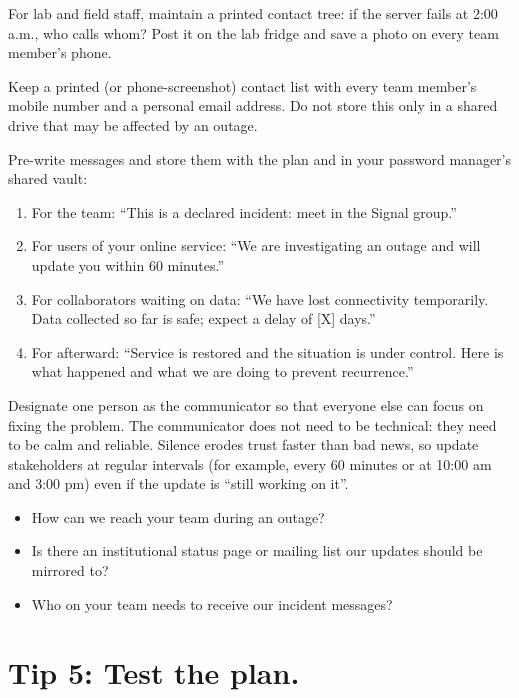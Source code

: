 \documentclass[10pt,letterpaper]{article}
\begin{document}
For lab and field staff, maintain a printed contact tree: if the server fails at
2:00 a.m., who calls whom? Post it on the lab fridge and save a photo on every
team member's phone.

Keep a printed (or phone-screenshot) contact list with every team member's
mobile number and a personal email address. Do not store this only in a shared
drive that may be affected by an outage.

Pre-write messages and store them with the plan and in your password manager's
shared vault:

\begin{enumerate}
\item
  For the team: ``This is a declared incident: meet in the Signal group.''
\item
  For users of your online service: ``We are investigating an outage and
  will update you within 60 minutes.''
\item
  For collaborators waiting on data: ``We have lost connectivity temporarily.
  Data collected so far is safe; expect a delay of [X] days.''
\item
  For afterward: ``Service is restored and the situation is under control.
  Here is what happened and what we are doing to prevent recurrence.''
\end{enumerate}

Designate one person as the communicator so that everyone else can focus on
fixing the problem. The communicator does not need to be technical: they need to
be calm and reliable. Silence erodes trust faster than bad news, so update
stakeholders at regular intervals (for example, every 60 minutes or at 10:00 am
and 3:00 pm) even if the update is ``still working on it''.

\begin{notebox}
  \begin{itemize}
  \item How can we reach your team during an outage?
  \item Is there an institutional status page or mailing list our updates should be mirrored to?
  \item Who on your team needs to receive our incident messages?
  \end{itemize}
\end{notebox}

\section*{Tip 5: Test the plan.}
\end{document}
